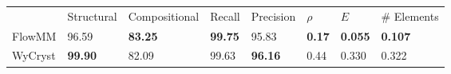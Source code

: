 \begin{tabular}{llllllll}
{} & {Structural} & {Compositional} & {Recall} & {Precision} & {$\rho$} & {$E$} & {# Elements} \\
FlowMM & 96.59 & \bfseries 83.25 & \bfseries 99.75 & 95.83 & \bfseries 0.17 & \bfseries 0.055 & \bfseries 0.107 \\
WyCryst & \bfseries 99.90 & 82.09 & 99.63 & \bfseries 96.16 & 0.44 & 0.330 & 0.322 \\
\end{tabular}
